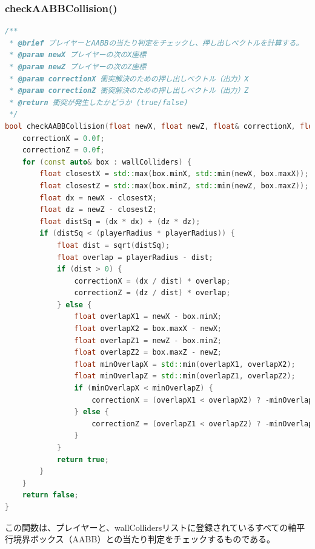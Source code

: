 \documentclass[uplatex,dvipdfmx,a4paper]{jsarticle}
\begin{document}
\hypertarget{func:checkAABBCollision}{}\subsubsection{checkAABBCollision()}\label{func:checkAABBCollision}
\begin{lstlisting}[language=C++, caption={checkAABBCollision() 関数}, label={lst:checkAABBCollision_detail}]
/**
 * @brief プレイヤーとAABBの当たり判定をチェックし、押し出しベクトルを計算する。
 * @param newX プレイヤーの次のX座標
 * @param newZ プレイヤーの次のZ座標
 * @param correctionX 衝突解決のための押し出しベクトル（出力）X
 * @param correctionZ 衝突解決のための押し出しベクトル（出力）Z
 * @return 衝突が発生したかどうか (true/false)
 */
bool checkAABBCollision(float newX, float newZ, float& correctionX, float& correctionZ) {
    correctionX = 0.0f;
    correctionZ = 0.0f;
    for (const auto& box : wallColliders) {
        float closestX = std::max(box.minX, std::min(newX, box.maxX));
        float closestZ = std::max(box.minZ, std::min(newZ, box.maxZ));
        float dx = newX - closestX;
        float dz = newZ - closestZ;
        float distSq = (dx * dx) + (dz * dz);
        if (distSq < (playerRadius * playerRadius)) {
            float dist = sqrt(distSq);
            float overlap = playerRadius - dist;
            if (dist > 0) {
                correctionX = (dx / dist) * overlap;
                correctionZ = (dz / dist) * overlap;
            } else {
                float overlapX1 = newX - box.minX;
                float overlapX2 = box.maxX - newX;
                float overlapZ1 = newZ - box.minZ;
                float overlapZ2 = box.maxZ - newZ;
                float minOverlapX = std::min(overlapX1, overlapX2);
                float minOverlapZ = std::min(overlapZ1, overlapZ2);
                if (minOverlapX < minOverlapZ) {
                    correctionX = (overlapX1 < overlapX2) ? -minOverlapX : minOverlapX;
                } else {
                    correctionZ = (overlapZ1 < overlapZ2) ? -minOverlapZ : minOverlapZ;
                }
            }
            return true;
        }
    }
    return false;
}
\end{lstlisting}
この関数は、プレイヤーと、wallCollidersリストに登録されているすべての軸平行境界ボックス（AABB）との当たり判定をチェックするものである。
\end{document}
